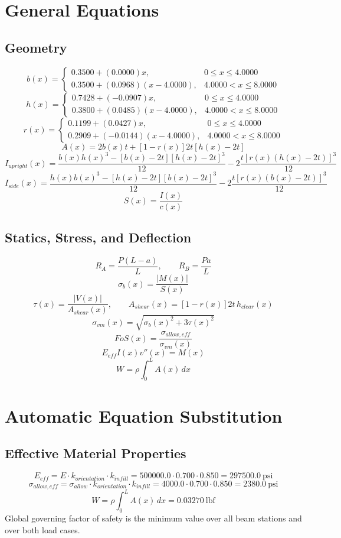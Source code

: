 \documentclass[11pt]{article}
\begin{document}
\section*{General Equations}
\subsection*{Geometry}
\[
b(x)=\begin{cases}0.3500 + (0.0000)x, & 0 \le x \le 4.0000\\0.3500 + (0.0968)(x-4.0000), & 4.0000 < x \le 8.0000\end{cases}
\]
\[
h(x)=\begin{cases}0.7428 + (-0.0907)x, & 0 \le x \le 4.0000\\0.3800 + (0.0485)(x-4.0000), & 4.0000 < x \le 8.0000\end{cases}
\]
\[
r(x)=\begin{cases}0.1199 + (0.0427)x, & 0 \le x \le 4.0000\\0.2909 + (-0.0144)(x-4.0000), & 4.0000 < x \le 8.0000\end{cases}
\]
\[
A(x)=2b(x)t+[1-r(x)]2t[h(x)-2t]
\]
\[
I_{upright}(x)=\frac{b(x)h(x)^3-[b(x)-2t][h(x)-2t]^3}{12}-2\frac{t[r(x)(h(x)-2t)]^3}{12}
\]
\[
I_{side}(x)=\frac{h(x)b(x)^3-[h(x)-2t][b(x)-2t]^3}{12}-2\frac{t[r(x)(b(x)-2t)]^3}{12}
\]
\[
S(x)=\frac{I(x)}{c(x)}
\]

\subsection*{Statics, Stress, and Deflection}
\[
R_A=\frac{P(L-a)}{L}, \qquad R_B=\frac{Pa}{L}
\]
\[
\sigma_b(x)=\frac{|M(x)|}{S(x)}
\]
\[
\tau(x)=\frac{|V(x)|}{A_{shear}(x)}, \qquad A_{shear}(x)=[1-r(x)]2t\,h_{clear}(x)
\]
\[
\sigma_{vm}(x)=\sqrt{\sigma_b(x)^2+3\tau(x)^2}
\]
\[
FoS(x)=\frac{\sigma_{allow,eff}}{\sigma_{vm}(x)}
\]
\[
E_{eff}I(x)v''(x)=M(x)
\]
\[
W=\rho\int_0^L A(x)\,dx
\]

\section*{Automatic Equation Substitution}
\subsection*{Effective Material Properties}
\[E_{eff} = E \cdot k_{orientation} \cdot k_{infill} = 500000.0 \cdot 0.700 \cdot 0.850 = 297500.0\ \mathrm{psi}\]
\[\sigma_{allow,eff} = \sigma_{allow} \cdot k_{orientation} \cdot k_{infill} = 4000.0 \cdot 0.700 \cdot 0.850 = 2380.0\ \mathrm{psi}\]
\[W = \rho \int_0^L A(x)\,dx = 0.03270\ \mathrm{lbf}\]
Global governing factor of safety is the minimum value over all beam stations and over both load cases.
\end{document}
